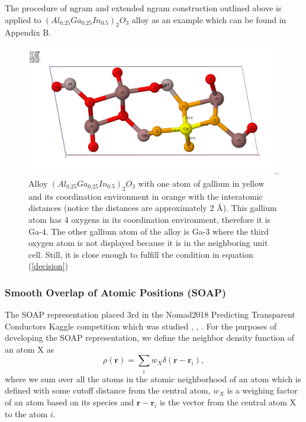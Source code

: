 \documentclass[11pt,oneside,czech,american]{book} %
\theoremstyle{plain}
\theoremstyle{definition}
\begin{document}
The procedure of ngram and extended ngram construction outlined above is applied to $(Al_{0.25}Ga_{0.25}In_{0.5})_2 O_3$ alloy as an example which can be found in Appendix B.
\begin{figure}[H]
	\centering
	\includegraphics[scale=0.23]{train_id_20_final_Ga4_hotovo.png}
	\caption{Alloy $(Al_{0.25}Ga_{0.25}In_{0.5})_2 O_3$ with one atom of gallium in yellow and its coordination environment in orange with the interatomic distances (notice the distances are approximately 2 $\text{\AA}$). This gallium atom has 4 oxygens in its coordination environment, therefore it is Ga-4. The other gallium atom of the alloy is Ga-3 where the third oxygen atom is not displayed because it is in the neighboring unit cell. Still, it is close enough to fulfill the condition in equation (\ref{decision}) \parencite{jmol}}
\end{figure}

\subsubsection{Smooth Overlap of Atomic Positions (SOAP)}
The SOAP representation placed 3rd in the Nomad2018 Predicting Transparent Conductors Kaggle competition which was studied \parencite{sutton18}, \parencite{sutton19}, \parencite{kaggle_web}. For the purposes of developing the SOAP representation, we define the neighbor density function of an atom X as
\begin{equation}
	\rho(\bm{r}) = \sum_{i} w_{X} \delta(\bm{r}-\bm{r}_i),
\end{equation}
where we sum over all the atoms in the atomic neighborhood of an atom which is defined with some cutoff distance from the central atom, $w_{X}$ is a weighing factor of an atom based on its species and $\bm{r} - \bm{r}_i$ is the vector from the central atom X to the atom $i$.
\end{document}
